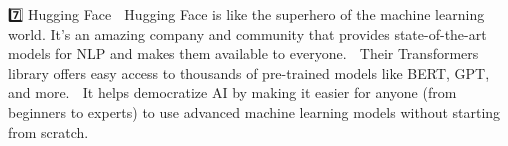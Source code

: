 7️⃣ Hugging Face 🦄
Hugging Face is like the superhero of the machine learning world. It's an amazing company and community that provides state-of-the-art models for NLP and makes them available to everyone. 🎉
Their Transformers library offers easy access to thousands of pre-trained models like BERT, GPT, and more. 🧠
It helps democratize AI by making it easier for anyone (from beginners to experts) to use advanced machine learning models without starting from scratch. 🧑‍💻
